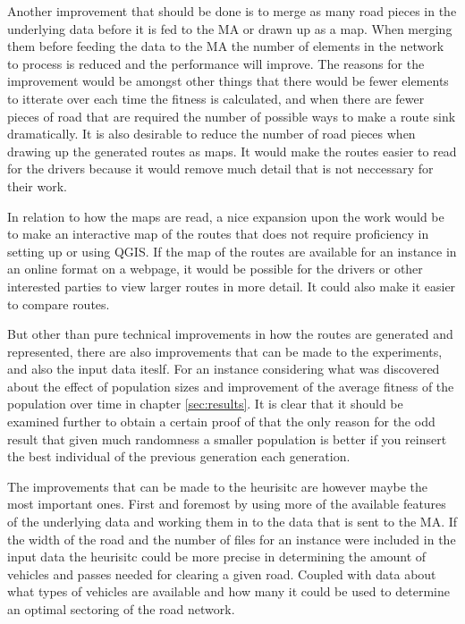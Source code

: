 Another improvement that should be done is to merge as many road pieces in the underlying data before it is fed to the MA or drawn up as a map. When merging them before feeding the data to the MA the number of elements in the network to process is reduced and the performance will improve. The reasons for the improvement would be amongst other things that there would be fewer elements to itterate over each time the fitness is calculated, and when there are fewer pieces of road that are required the number of possible ways to make a route sink dramatically. It is also desirable to reduce the number of road pieces when drawing up the generated routes as maps. It would make the routes easier to read for the drivers because it would remove much detail that is not neccessary for their work.

In relation to how the maps are read, a nice expansion upon the work would be to make an interactive map of the routes that does not require proficiency in setting up or using QGIS. If the map of the routes are available for an instance in an online format on a webpage, it would be possible for the drivers or other interested parties to view larger routes in more detail. It could also make it easier to compare routes.

But other than pure technical improvements in how the routes are generated and represented, there are also improvements that can be made to the experiments, and also the input data iteslf. For an instance considering what was discovered about the effect of population sizes and improvement of the average fitness of the population over time in chapter \ref{sec:results}. It is clear that it should be examined further to obtain a certain proof of that the only reason for the odd result that given much randomness a smaller population is better if you reinsert the best individual of the previous generation each generation.

The improvements that can be made to the heurisitc are however maybe the most important ones. First and foremost by using more of the available features of the underlying data and working them in to the data that is sent to the MA. If the width of the road and the number of files for an instance were included in the input data the heurisitc could be more precise in determining the amount of vehicles and passes needed for clearing a given road. Coupled with data about what types of vehicles are available and how many it could be used to determine an optimal sectoring of the road network.

